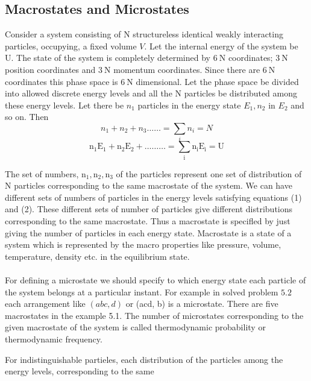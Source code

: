 \subsection{Macrostates and Microstates}
\par Consider a system consisting of $\mathrm{N}$ structureless identical weakly interacting particles, occupying, a fixed volume $V$. Let the internal energy of the system be U. The state of the system is completely determined by $6 \mathrm{~N}$ coordinates; $3 \mathrm{~N}$ position coordinates and $3 \mathrm{~N}$ momentum coordinates. Since there are $6 \mathrm{~N}$ coordinates this phase space is $6 \mathrm{~N}$ dimensional. Let the phase space be divided into allowed discrete energy levels and all the $\mathrm{N}$ particles be distributed among these energy levels. Let there be $n_{1}$ particles in the energy state $E_{1}, n_{2}$ in $E_{2}$ and so on. Then
$$n_{1}+n_{2}+n_{3} \ldots \ldots=\sum_{i} n_{i}=N$$
$$\mathrm{n}_{1} \mathrm{E}_{1}+\mathrm{n}_{2} \mathrm{E}_{2}+\ldots \ldots \ldots=\sum_{\mathrm{i}} \mathrm{n}_{\mathrm{i}} \mathrm{E}_{\mathrm{i}}=\mathrm{U}$$
\par The set of numbers, $\mathrm{n}_{1}, \mathrm{n}_{2}, \mathrm{n}_{3}$ of the particles represent one set of distribution of $\mathrm{N}$ particles corresponding to the same macrostate of the system. We can have different sets of numbers of particles in the energy levels satisfying equations (1) and (2). These different sets of number of particles give different distributions corresponding to the same macrostate. Thus a macrostate is specifled by just giving the number of particles in each energy state. Macrostate is a state of a system which is represented by the macro properties like pressure, volume, temperature, density etc. in the equilibrium state.\\\\
For defining a microstate we should specify to which energy state each particle of the system belongs at a particular instant. For example in solved problem $5.2$ each arrangement like $(a b c, d)$ or (acd, b) is a microstate. There are five macrostates in the example 5.1. The number of microstates corresponding to the given macrostate of the system is called thermodynamic probability or thermodynamic frequency.
\par For indistinguishable partieles, each distribution of the particles among the energy levels, corresponding to the same